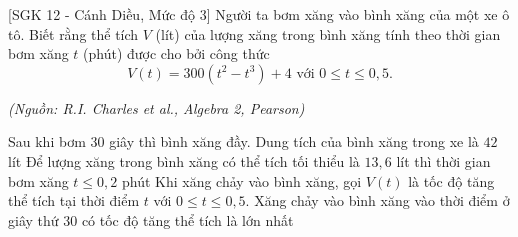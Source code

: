 \begin{ex}%
[SGK 12 - Cánh Diều, Mức độ 3]%
	Người ta bơm xăng vào bình xăng của một xe ô tô. Biết rằng thể tích $V$ (lít) của lượng xăng trong bình xăng tính theo thời gian bơm xăng $t$ (phút) được cho bởi công thức $$V(t)=300(t^2-t^3)+4 \text{ với } 0\le t\le 0{,}5.$$
	\begin{flushright}
		\textit{(Nguồn: R.I. Charles et al., Algebra 2, Pearson)}
	\end{flushright}
	{Sau khi bơm $30$ giây thì bình xăng đầy. Dung tích của bình xăng trong xe là $42$ lít}
	{Để lượng xăng trong bình xăng có thể tích tối thiểu là $13{,}6$ lít thì thời gian bơm xăng $t\le 0{,}2$ phút}
	{\True Khi xăng chảy vào bình xăng, gọi $V(t)$ là tốc độ tăng thể tích tại thời điểm $t$ với $0\le t\le 0{,}5$. Xăng chảy vào bình xăng vào thời điểm ở giây thứ $30$ có tốc độ tăng thể tích là lớn nhất}
\end{ex}

